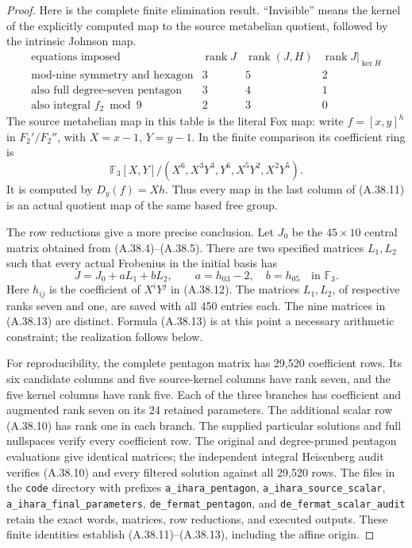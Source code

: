 \begin{proof}
Here is the complete finite elimination result. ``Invisible''
means the kernel of the explicitly computed map to the source
metabelian quotient, followed by the intrinsic Johnson map.
\[
\begin{array}{c|rrr}
 \text{equations imposed}&\operatorname{rank}J&
       \operatorname{rank}(J,H)&\operatorname{rank}J|_{\ker H}\\ \hline
 \text{mod-nine symmetry and hexagon}&3&5&2\\
 \text{also full degree-seven pentagon}&3&4&1\\
 \text{also integral }f_2\bmod9&2&3&0
\end{array}
 \tag{A.38.11}
\]
The source metabelian map in this table is the literal Fox map:
write $f=[x,y]^h$ in $F_2'/F_2''$, with
$X=x-1$, $Y=y-1$. In the finite comparison its coefficient
ring is
\[
 \mathbb F_3[X,Y]/(X^6,X^3Y^3,Y^6,X^5Y^2,X^2Y^5).
 \tag{A.38.12}
\]
It is computed by $D_y(f)=Xh$. Thus every map in the last
column of (A.38.11) is an actual quotient map of the same
based free group.

The row reductions give a more precise conclusion. Let $J_0$
be the $45\times10$ central matrix obtained from
(A.38.4)--(A.38.5). There are two specified matrices $L_1,L_2$
such that every actual Frobenius in the initial basis has
\[
 J=J_0+aL_1+bL_2,\qquad
       a=h_{03}-2,\quad b=h_{05}\quad\text{in }\mathbb F_3.
 \tag{A.38.13}
\]
Here $h_{ij}$ is the coefficient of $X^iY^j$ in (A.38.12).
The matrices $L_1,L_2$, of respective ranks seven and one,
are saved with all 450 entries each. The nine matrices in
(A.38.13) are distinct. Formula (A.38.13) is at this point a
necessary arithmetic constraint; the realization follows below.

For reproducibility, the complete pentagon matrix has 29,520
coefficient rows. Its six candidate columns and five source-kernel
columns have rank seven, and the five kernel columns have rank
five. Each of the three branches has coefficient and augmented
rank seven on its 24 retained parameters. The additional scalar
row (A.38.10) has rank one in each branch. The supplied particular
solutions and full nullspaces verify every coefficient row.
The original and degree-pruned pentagon evaluations give identical
matrices; the independent integral Heisenberg audit verifies
(A.38.10) and every filtered solution against all 29,520 rows.
The files in the \texttt{code} directory with prefixes
\texttt{a\_ihara\_pentagon}, \texttt{a\_ihara\_source\_scalar},
\texttt{a\_ihara\_final\_parameters},
\texttt{de\_fermat\_pentagon}, and
\texttt{de\_fermat\_scalar\_audit} retain the exact words,
matrices, row reductions, and executed outputs. These finite
identities establish (A.38.11)--(A.38.13), including the affine
origin.


\end{proof}
